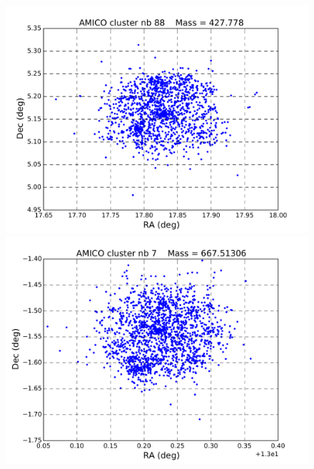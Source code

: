 \documentclass[a4paper,11pt]{article}
\numberwithin{equation}{section}
\begin{document}
\begin{figure}[H]
  	\begin{minipage}[b]{0.48\textwidth}
		  \includegraphics[width=\linewidth]{88.pdf}
    \end{minipage}
		\hfill
		\begin{minipage}[b]{0.48\textwidth}
		  \includegraphics[width=\linewidth]{7.pdf}
  	\end{minipage}
  \end{figure}
    
\end{document}
